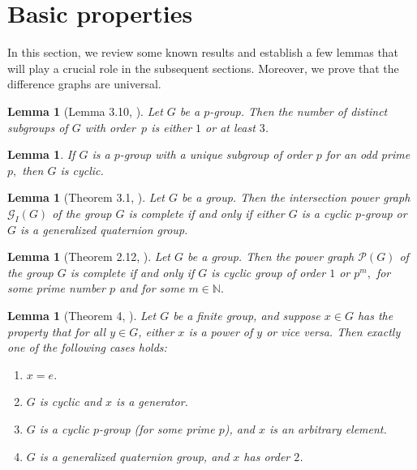 \documentclass[12pt]{amsart}
\theoremstyle{plain}
\newtheorem{lemma}[theorem]{Lemma}
\theoremstyle{remark}
\theoremstyle{definition}
\begin{document}
\section{Basic properties}
\label{sec:basic-props}
In this section, we review some known results and establish a few lemmas that will play a crucial role in the subsequent sections. Moreover, we prove that the difference graphs are universal.

\begin{lemma}[Lemma 3.10, \cite{bera-dey-JGT}]
Let $G$ be a $p$-group. Then the number of distinct subgroups of $G$ with order~$p$ is either $1$ or at least $3$.    
\end{lemma}

\begin{lemma}\cite[Theorem 5.4.10]{gorenstein} \label{Lemma:Burnside}
If $G$ is a $p$-group with a unique subgroup of order $p$ for an odd prime $p,$ then $G$ is cyclic.    
\end{lemma}

\begin{lemma}[Theorem 3.1, \cite{intersectionpwegraphb3}]\label{ipg_complete}
Let $G$ be a group. Then the intersection power graph $\mathcal{G}_I(G)$ of the group $G$ is complete if and only if either $G$ is a cyclic $p$-group or $G$ is a generalized quaternion group.
\end{lemma}

\begin{lemma}[Theorem 2.12, \cite{undpwrgraphofsemgmainsgc1}]\label{cyc_complete}
Let $G$ be a group. Then the power graph $\mathcal{P}(G)$ of the group $G$ is complete if and only if $G$ is cyclic group of order $1$ or $p^m,$ for some prime number $p$ and for some $m\in \mathbb{N}.$
\end{lemma}


\begin{lemma}[Theorem 4, \cite{cj}]\label{l:dom}
Let \(G\) be a finite group, and suppose \(x \in G\) has the property that
 for all $y\in G$, either $x$ is a power of $y$ or vice versa. Then exactly one of the following cases holds:
\begin{enumerate}
  \item \(x = e\).
  \item \(G\) is cyclic and \(x\) is a generator.
  \item \(G\) is a cyclic \(p\)-group (for some prime \(p\)), and \(x\) is an arbitrary element.
  \item \(G\) is a generalized quaternion group, and \(x\) has order \(2\).
\end{enumerate}
\end{lemma}
\end{document}
